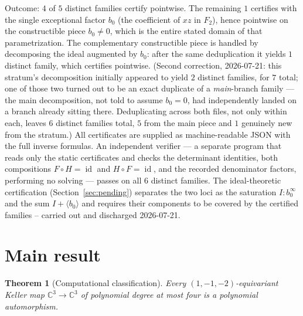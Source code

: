 \documentclass[11pt]{article}
\newtheorem{theorem}{Theorem}
\newcommand{\C}{\mathbb{C}}
\begin{document}
Outcome: $4$ of $5$ distinct families certify pointwise. The remaining $1$
certifies with the single exceptional factor $b_0$ (the coefficient of $xz$
in $F_2$), hence pointwise on the constructible piece $b_0\neq0$, which is the
entire stated domain of that parametrization. The complementary constructible
piece is handled by decomposing the ideal augmented by $b_0$: after the same
deduplication it yields $1$ distinct family, which certifies pointwise.
(Second correction, 2026-07-21: this stratum's decomposition initially
appeared to yield $2$ distinct families, for $7$ total; one of those two
turned out to be an exact duplicate of a \emph{main}-branch family --- the
main decomposition, not told to assume $b_0=0$, had independently landed on
a branch already sitting there. Deduplicating across both files, not only
within each, leaves $6$ distinct families total, $5$ from the main piece and
$1$ genuinely new from the stratum.) All certificates are supplied as
machine-readable JSON with the full inverse formulas. An independent
verifier --- a separate program that reads only the static certificates and
checks the determinant identities, both compositions
$F\circ H=\operatorname{id}$ and $H\circ F=\operatorname{id}$, and the
recorded denominator factors, performing no solving --- passes on all $6$
distinct families. The ideal-theoretic certification
(Section~\ref{sec:pending}) separates the two loci as the saturation
$I:b_0^{\infty}$ and the sum $I+\langle b_0\rangle$ and requires their
components to be covered by the certified families -- carried out and
discharged 2026-07-21.

\section{Main result}

\begin{theorem}[Computational classification]\label{thm:main}
Every $(1,-1,-2)$-equivariant Keller map $\C^3\to\C^3$ of polynomial degree at
most four is a polynomial automorphism.
\end{theorem}
\end{document}
